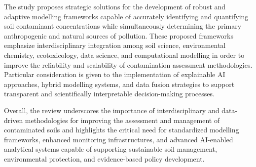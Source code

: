 \documentclass[environments,article,submit,pdftex,moreauthors]{Definitions/mdpi}
\begin{document}
The study proposes strategic solutions for the development of robust and
adaptive modelling frameworks capable of accurately identifying and quantifying
soil contaminant concentrations while simultaneously determining the primary
anthropogenic and natural sources of pollution. These proposed frameworks
emphasize interdisciplinary integration among soil science, environmental
chemistry, ecotoxicology, data science, and computational modelling in order
to improve the reliability and scalability of contamination assessment
methodologies. Particular consideration is given to the implementation of
explainable AI approaches, hybrid modelling systems, and data fusion strategies
to support transparent and scientifically interpretable decision-making
processes.

Overall, the review underscores the importance of interdisciplinary and
data-driven methodologies for improving the assessment and management of
contaminated soils and highlights the critical need for standardized modelling
frameworks, enhanced monitoring infrastructures, and advanced AI-enabled
analytical systems capable of supporting sustainable soil management,
environmental protection, and evidence-based policy development.








\end{document}
